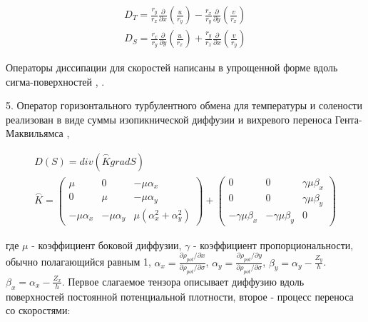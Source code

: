 	\begin{equation} \label{eq:inmsom/8} 
	\begin{array}{c} 
	\displaystyle{D_{T} =\frac{r_{y} }{r_{x} } \frac{\partial }{\partial x} \left(\frac{u}{r_{y} } \right)-\frac{r_{x} }{r_{y} } \frac{\partial }{\partial y} \left(\frac{v}{r_{x} } \right)} \\ 
	
	\displaystyle{D_{S} =\frac{r_{x} }{r_{y} } \frac{\partial }{\partial y} \left(\frac{u}{r_{x} } \right)+\frac{r_{y} }{r_{x} } \frac{\partial }{\partial x} \left(\frac{v}{r_{y} } \right)} 
	\end{array} 
	\end{equation} 

	Операторы диссипации для скоростей написаны в упрощенной форме вдоль сигма-поверхностей \cite{INMOM}, \cite{NCARClimateSystemModel}.

	5. Оператор горизонтального турбулентного обмена для температуры и солености реализован в виде суммы изопикнической диффузии и 
	вихревого переноса Гента-Маквильямса \cite{NCARClimateSystemModel}, \cite{OceanicIsopycnalMixingbyCoordinateRotation} %

	\begin{equation} \label{eq:inmsom/9} 
	\begin{array}{c} 
	\displaystyle{D(S)=div(\stackrel{\frown}{K}gradS)} \\ 
	
	\displaystyle{\stackrel{\frown}{K}=\left(\begin{array}{ccc} {\mu } & {0} & {-\mu \alpha _{x} } \\ 
								    {0} & {\mu } & {-\mu \alpha _{y} } \\ 
								    {-\mu \alpha _{x} } & {-\mu \alpha _{y} } & {\mu (\alpha _{x} ^{2} +\alpha _{y} ^{2} )} 
						 \end{array}
		      \right)+\left(\begin{array}{ccc} {0} & {0} & {\gamma \mu \beta _{x} } \\ {0} & {0} & {\gamma \mu \beta _{y} } \\ 
						       {-\gamma \mu \beta _{x} } & {-\gamma \mu \beta _{y} } & {0} 
				    \end{array}\right)} 
	\end{array} 
	\end{equation} 

	где $\mu$ - коэффициент боковой диффузии, $\gamma $ - коэффициент пропорциональности, обычно полагающийся равным 1, 
	$\displaystyle{ \alpha _{x} =\frac{\partial \rho _{pot} /\partial x}{\partial \rho _{pot} /\partial \sigma } }$, 
	$\displaystyle{ \alpha _{y} =\frac{\partial \rho _{pot} /\partial y}{\partial \rho _{pot} /\partial \sigma } }$, 
	$\displaystyle{ \beta _{y} =\alpha _{y} - \frac{Z_{y} }{h} }$.
	$\displaystyle{ \beta _{x} =\alpha _{x} -\frac{Z_{x} }{h} }$.
	Первое слагаемое тензора описывает диффузию вдоль поверхностей постоянной потенциальной плотности, второе - процесс переноса со скоростями:

